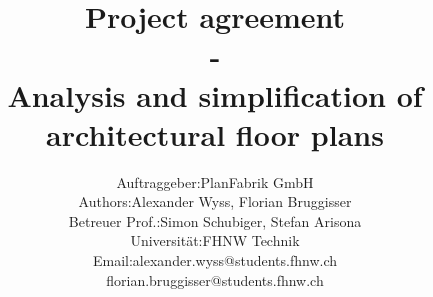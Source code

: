 \documentclass[11pt, a4paper]{report}
\begin{document}
	\title{\textbf{Project agreement \\ - \\Analysis and simplification of architectural floor plans}}
	\author{
			\begin{tabular}{l  l}
				Auftraggeber: & PlanFabrik GmbH \\
				Authors: & Alexander Wyss, Florian Bruggisser \\
				Betreuer Prof.: & Simon Schubiger, Stefan Arisona \\ Universität: & FHNW Technik \\
				Email: & alexander.wyss@students.fhnw.ch \\ & florian.bruggisser@students.fhnw.ch				
			\end{tabular}
	}
	
	\maketitle
	\tableofcontents
	
	
	
	
	
	
	
\end{document}

